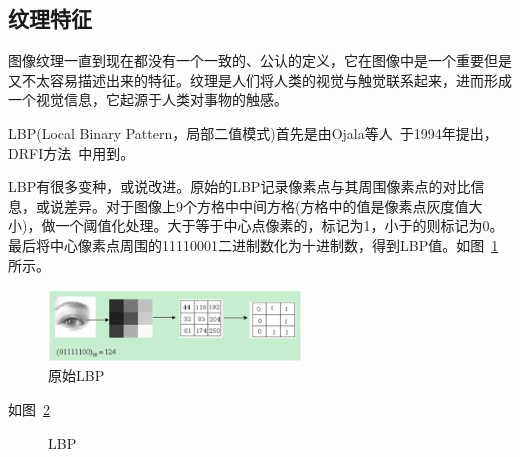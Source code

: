 \documentclass[12pt]{article}
\begin{document}
\subsection{纹理特征}

图像纹理一直到现在都没有一个一致的、公认的定义，它在图像中是一个重要但是又不太容易描述出来的特征。纹理是人们将人类的视觉与触觉联系起来，进而形成一个视觉信息，它起源于人类对事物的触感。

LBP(Local Binary Pattern，局部二值模式)首先是由Ojala等人~\cite{ojala1994performance}于1994年提出，DRFI方法~\cite{jianghuaizu2013salient}中用到。

LBP有很多变种，或说改进。原始的LBP记录像素点与其周围像素点的对比信息，或说差异。对于图像上9个方格中中间方格(方格中的值是像素点灰度值大小)，做一个阈值化处理。大于等于中心点像素的，标记为1，小于的则标记为0。最后将中心像素点周围的11110001二进制数化为十进制数，得到LBP值。如图~\ref{fig: LBP}所示。

\begin{figure}[!ht]
\centering
\includegraphics[width=0.6\textwidth]{LBP.png}
\caption{原始LBP}
\label{fig: LBP}
\end{figure} 

如图~\ref{fig: LBP特征}

\begin{figure}
  \centering 
  \caption{LBP}
  \label{fig: LBP特征} %
\end{figure}
\end{document}
